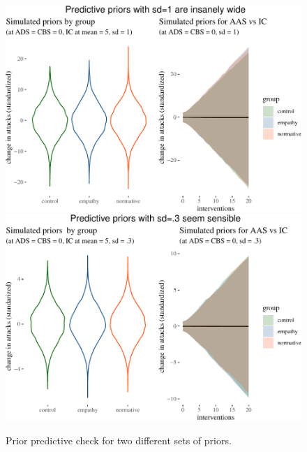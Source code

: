 \documentclass[preprint,12pt]{elsarticle}
\begin{document}
\begin{figure}

\begin{center}\includegraphics[width=0.8\linewidth]{ figures/fig:priorCheck-1} \includegraphics[width=0.8\linewidth]{ figures/fig:priorCheck-2} \end{center}

\caption{Prior predictive check for two different sets of priors.}
\label{fig:priors}
\end{figure}









\end{document}
